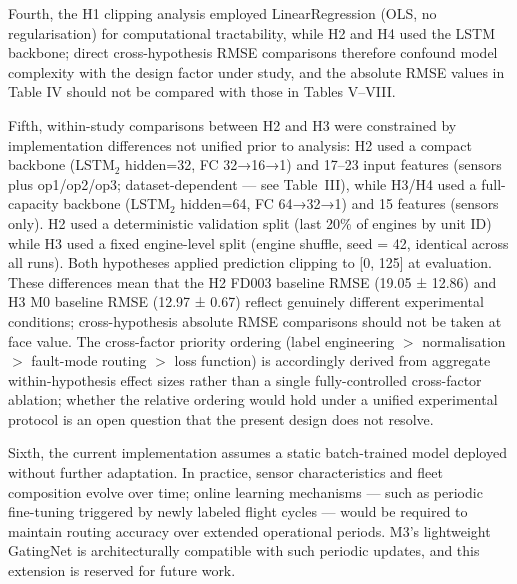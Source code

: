 \documentclass[preprint,10pt]{elsarticle}
\begin{document}
Fourth, the H1 clipping analysis employed LinearRegression (OLS, no regularisation) for computational tractability, while H2 and H4 used the LSTM backbone; direct cross-hypothesis RMSE comparisons therefore confound model complexity with the design factor under study, and the absolute RMSE values in Table IV should not be compared with those in Tables V–VIII.

Fifth, within-study comparisons between H2 and H3 were constrained by implementation differences not unified prior to analysis: H2 used a compact backbone (LSTM$_2$ hidden=32, FC 32→16→1) and 17--23 input features (sensors plus op1/op2/op3; dataset-dependent — see Table~III), while H3/H4 used a full-capacity backbone (LSTM$_2$ hidden=64, FC 64→32→1) and 15 features (sensors only). H2 used a deterministic validation split (last 20\% of engines by unit ID) while H3 used a fixed engine-level split (engine shuffle, seed = 42, identical across all runs). Both hypotheses applied prediction clipping to [0, 125] at evaluation. These differences mean that the H2 FD003 baseline RMSE (19.05 ± 12.86) and H3 M0 baseline RMSE (12.97 ± 0.67) reflect genuinely different experimental conditions; cross-hypothesis absolute RMSE comparisons should not be taken at face value. The cross-factor priority ordering (label engineering $>$ normalisation $>$ fault-mode routing $>$ loss function) is accordingly derived from aggregate within-hypothesis effect sizes rather than a single fully-controlled cross-factor ablation; whether the relative ordering would hold under a unified experimental protocol is an open question that the present design does not resolve.

Sixth, the current implementation assumes a static batch-trained model deployed without further adaptation. In practice, sensor characteristics and fleet composition evolve over time; online learning mechanisms — such as periodic fine-tuning triggered by newly labeled flight cycles — would be required to maintain routing accuracy over extended operational periods. M3's lightweight GatingNet is architecturally compatible with such periodic updates, and this extension is reserved for future work.
\end{document}
